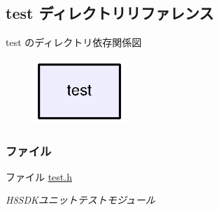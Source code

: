 \subsection{test ディレクトリリファレンス}
\label{dir_13e138d54eb8818da29c3992edef070a}
test のディレクトリ依存関係図
\nopagebreak
\begin{figure}[H]
\begin{center}
\leavevmode
\includegraphics[width=98pt]{dir_13e138d54eb8818da29c3992edef070a_dep}
\end{center}
\end{figure}
\subsubsection*{ファイル}
\begin{DoxyCompactItemize}
\item 
ファイル \hyperlink{test_8h}{test.\+h}
\begin{DoxyCompactList}\small\item\em H8\+S\+D\+Kユニットテストモジュール \end{DoxyCompactList}\end{DoxyCompactItemize}
